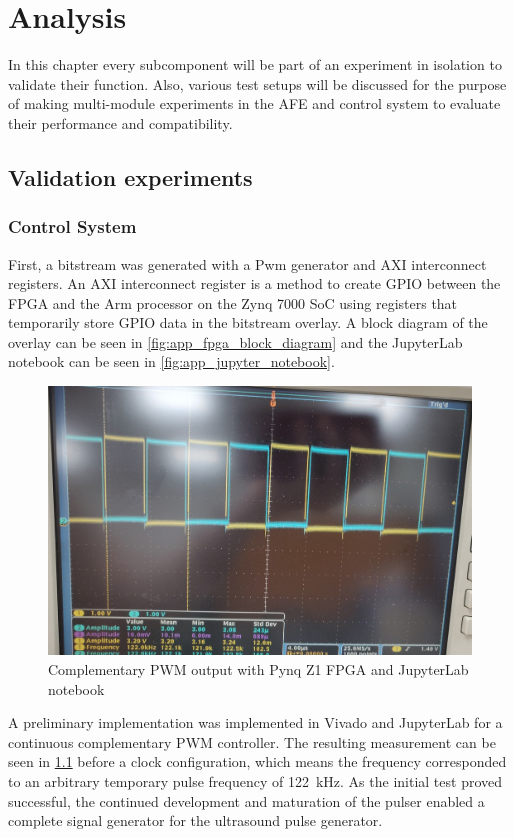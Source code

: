 \chapter{Analysis}
In this chapter every subcomponent will be part of an experiment in isolation to validate their function. Also, various test setups will be discussed for the purpose of making multi-module experiments in the AFE and control system to evaluate their performance and compatibility.

\section{Validation experiments}
\subsection{Control System}
First, a bitstream was generated with a Pwm generator and AXI interconnect registers. An AXI interconnect register is a method to create GPIO between the FPGA and the Arm processor on the Zynq 7000 SoC using registers that temporarily store GPIO data in the bitstream overlay. A block diagram of the overlay can be seen in \cref{fig:app_fpga_block_diagram} and the JupyterLab notebook can be seen in \cref{fig:app_jupyter_notebook}.

\begin{figure}[htbp]
	\centering
	\includegraphics[width=.8\textwidth]{Figures/4_controlsystem_fpga_pwm.png}
	\caption{Complementary PWM output with Pynq Z1 FPGA and JupyterLab notebook}
	\label{fig:4_controlsystem_fpga_pwm}
\end{figure}
A preliminary implementation was implemented in Vivado and JupyterLab for a continuous complementary PWM controller. The resulting measurement can be seen in \cref{fig:4_controlsystem_fpga_pwm} before a clock configuration, which means the frequency corresponded to an arbitrary temporary pulse frequency of \qty{122}{\kilo\hertz}. As the initial test proved successful, the continued development and maturation of the pulser enabled a complete signal generator for the ultrasound pulse generator.

